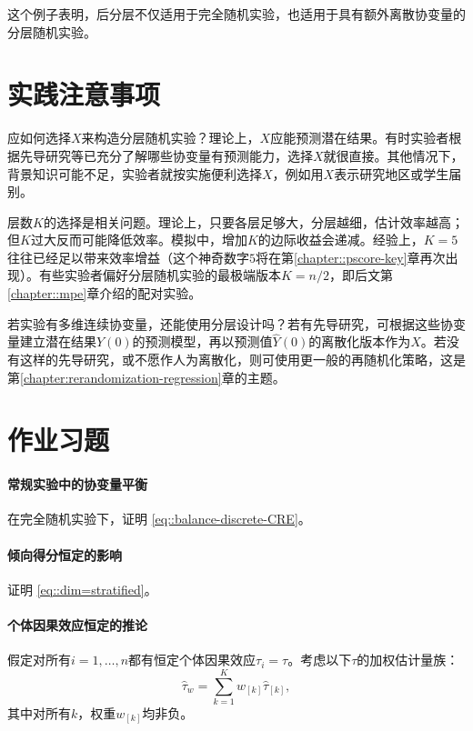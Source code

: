 这个例子表明，后分层不仅适用于完全随机实验，也适用于具有额外离散协变量的分层随机实验。 


\section{实践注意事项}


应如何选择$X$来构造分层随机实验？理论上，$X$应能预测潜在结果。有时实验者根据先导研究等已充分了解哪些协变量有预测能力，选择$X$就很直接。其他情况下，背景知识可能不足，实验者就按实施便利选择$X$，例如用$X$表示研究地区或学生届别。 


层数$K$的选择是相关问题。理论上，只要各层足够大，分层越细，估计效率越高；但$K$过大反而可能降低效率。模拟中，增加$K$的边际收益会递减。经验上，$K = 5$往往已经足以带来效率增益（这个神奇数字$5$将在第\ref{chapter::pscore-key}章再次出现）。有些实验者偏好分层随机实验的最极端版本$K=n/2$，即后文第\ref{chapter::mpe}章介绍的配对实验。  


若实验有多维连续协变量，还能使用分层设计吗？若有先导研究，可根据这些协变量建立潜在结果$Y(0)$的预测模型，再以预测值$\hat{Y}(0)$的离散化版本作为$X$。若没有这样的先导研究，或不愿作人为离散化，则可使用更一般的再随机化策略，这是第\ref{chapter:rerandomization-regression}章的主题。 

 
 
 \section{作业习题}
 
 
  \paragraph{常规实验中的协变量平衡}\label{hw::balance-discrete-CRE}
  
 在完全随机实验下，证明 \eqref{eq::balance-discrete-CRE}。 
 
 \paragraph{倾向得分恒定的影响}
\label{hw::sre-additional-neyman}

证明 \eqref{eq::dim=stratified}。 


\paragraph{个体因果效应恒定的推论}

假定对所有$i=1,\ldots, n$都有恒定个体因果效应$\tau_i = \tau$。考虑以下$\tau$的加权估计量族：
$$
\hat{\tau}_w = \sum_{k=1}^K  w_{[k]}  \hat{\tau}_{[k]} ,
$$
其中对所有$k$，权重$w_{[k]}  $均非负。

